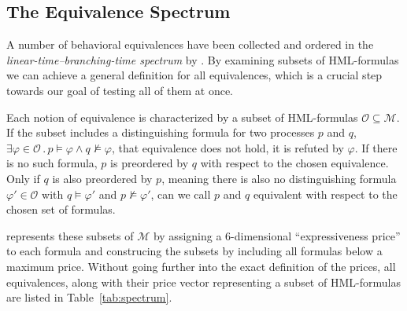 \subsection{The Equivalence Spectrum}

A number of behavioral equivalences have been collected and ordered
in the \emph{linear-time--branching-time spectrum}
by \textcite{glabbeek1990spectrum}.
By examining subsets of HML-formulas we can achieve a general definition
for all equivalences,
which is a crucial step towards our goal of testing all of them at once.

Each notion of equivalence is characterized by a subset of HML-formulas
$\mathcal{O} \subseteq \mathcal{M}$.
If the subset includes a distinguishing formula for two processes $p$ and $q$,
$\exists \varphi \in \mathcal{O}\,.\,
    p \models \varphi \wedge q \not\models \varphi$,
that equivalence does not hold, it is refuted by $\varphi$.
If there is no such formula,
$p$ is preordered by $q$ with respect to the chosen equivalence.
Only if $q$ is also preordered by $p$,
meaning there is also no distinguishing formula $\varphi' \in \mathcal{O}$
with $q \models \varphi'$ and $p \not\models \varphi'$,
can we call $p$ and $q$ equivalent with respect to the chosen set of formulas.

\textcite{bisping2023process} represents these subsets of $\mathcal{M}$
by assigning a 6-dimensional \enquote{expressiveness price} to each formula
and construcing the subsets by including all formulas below a maximum price.
Without going further into the exact definition of the prices,
all equivalences, along with their price vector representing a subset of
HML-formulas are listed in Table~\ref{tab:spectrum}.

